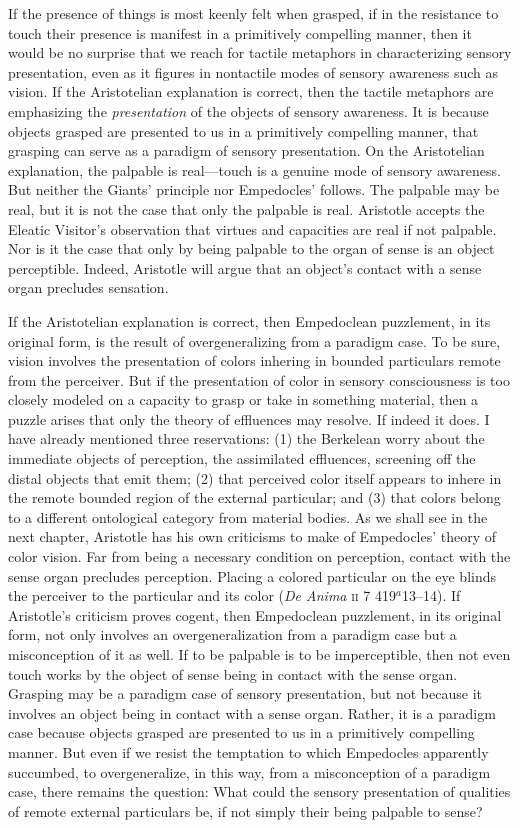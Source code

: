 If the presence of things is most keenly felt when grasped, if in the resistance to touch their presence is manifest in a primitively compelling manner, then it would be no surprise that we reach for tactile metaphors in characterizing sensory presentation, even as it figures in nontactile modes of sensory awareness such as vision. If the Aristotelian explanation is correct, then the tactile metaphors are emphasizing the \emph{presentation} of the objects of sensory awareness. It is because objects grasped are presented to us in a primitively compelling manner, that grasping can serve as a paradigm of sensory presentation. On the Aristotelian explanation, the palpable is real---touch is a genuine mode of sensory awareness. But neither the Giants' principle nor Empedocles' follows. The palpable may be real, but it is not the case that only the palpable is real. Aristotle accepts the Eleatic Visitor's observation that virtues and capacities are real if not palpable. Nor is it the case that only by being palpable to the organ of sense is an object perceptible. Indeed, Aristotle will argue that an object's contact with a sense organ precludes sensation.

If the Aristotelian explanation is correct, then Empedoclean puzzlement, in its original form,  is the result of overgeneralizing from a paradigm case. To be sure, vision involves the presentation of colors inhering in bounded particulars remote from the perceiver. But if the presentation of color in sensory consciousness is too closely modeled on a capacity to grasp or take in something material, then a puzzle arises that only the theory of effluences may resolve. If indeed it does. I have already mentioned three reservations: (1) the Berkelean worry about the immediate objects of perception, the assimilated effluences, screening off the distal objects that emit them; (2) that perceived color itself appears to inhere in the remote bounded region of the external particular; and (3) that colors belong to a different ontological category from material bodies. As we shall see in the next chapter, Aristotle has his own criticisms to make of Empedocles' theory of color vision. Far from being a necessary condition on perception, contact with the sense organ precludes perception. Placing a colored particular on the eye blinds the perceiver to the particular and its color (\emph{De Anima} \textsc{ii} 7 419\( ^{a} \)13--14). If Aristotle's criticism proves cogent, then Empedoclean puzzlement, in its original form, not only involves an overgeneralization from a paradigm case but a misconception of it as well. If to be palpable is to be imperceptible, then not even touch works by the object of sense being in contact with the sense organ. Grasping may be a paradigm case of sensory presentation, but not because it involves an object being in contact with a sense organ. Rather, it is a paradigm case because objects grasped are presented to us in a primitively compelling manner. But even if we resist the temptation to which Empedocles apparently succumbed, to overgeneralize, in this way, from a misconception of a paradigm case, there remains the question: What could the sensory presentation of qualities of remote external particulars be, if not simply their being palpable to sense?


